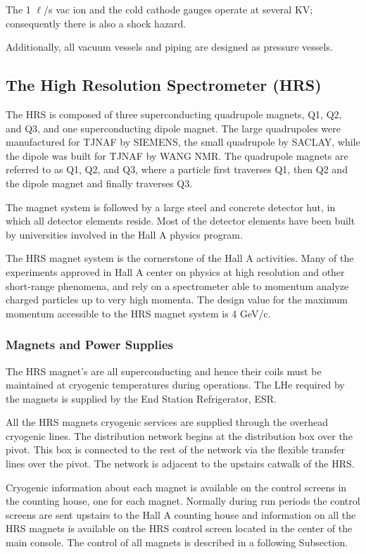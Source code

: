 The 1 $\ell$/s vac ion and the cold cathode gauges operate at several 
KV; consequently there is also a shock hazard.

Additionally, all vacuum vessels and piping are designed as pressure 
vessels.

\subsection{The High Resolution Spectrometer (HRS)}

The HRS is composed of three superconducting quadrupole magnets, Q1, Q2, 
and Q3, and one superconducting dipole magnet.  The large quadrupoles were 
manufactured for TJNAF by SIEMENS, the small quadrupole by SACLAY, while 
the dipole was built for TJNAF by WANG NMR.  The quadrupole magnets are 
referred to as Q1, Q2, and Q3, where a particle first traverses Q1, then 
Q2 and the dipole magnet and finally traverses Q3.

The magnet system is followed by a large steel and concrete detector 
hut, in which all detector elements reside.  Most of the 
detector elements have been built by universities involved in the Hall A 
physics program.

The HRS magnet system is the cornerstone of the Hall A activities.  
Many of the experiments approved in Hall A center on physics at high 
resolution and other short-range phenomena, and rely on a spectrometer 
able to momentum analyze charged particles up to very high momenta.  The 
design value for the maximum momentum accessible to the HRS magnet 
system is 4 GeV/c.

\subsubsection{Magnets and Power Supplies}

The HRS magnet's are all superconducting and hence their coils must be 
maintained at cryogenic temperatures during operations.  The LHe 
required by the magnets is supplied by the End Station Refrigerator, ESR.

All the HRS magnets cryogenic services are supplied through the overhead 
cryogenic lines.  The distribution network begins at the distribution 
box over the pivot.  This box is connected to the rest of the network 
via the flexible transfer lines over the pivot.  The network is adjacent 
to the upstairs catwalk of the HRS.

Cryogenic information about each magnet is available on the control 
screens in the counting house, one for each magnet.  Normally during run 
periods the control screens are sent upstairs to the Hall A counting 
house and information on all the HRS magnets is available on the HRS 
control screen located in the center of the main console.  The control 
of all magnets is described in a following Subsection.

